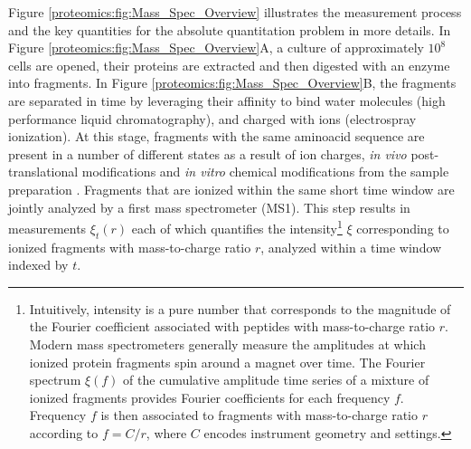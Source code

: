 Figure \ref{proteomics:fig:Mass_Spec_Overview} illustrates the measurement process and the key quantities for the absolute quantitation problem in more details.
In Figure \ref{proteomics:fig:Mass_Spec_Overview}A, a culture of approximately $10^{8}$ cells are opened, their proteins are extracted and then digested with an enzyme into fragments. 
In Figure \ref{proteomics:fig:Mass_Spec_Overview}B, the fragments are separated in time by leveraging their affinity to bind water molecules (high performance liquid chromatography), and charged with ions (electrospray ionization).
At this stage, fragments with the same aminoacid sequence are present in a number of different states as a result of ion charges, \emph{in vivo} post-translational modifications and \emph{in vitro} chemical modifications from the sample preparation \citep{Michalski:2011gm}. 
Fragments that are ionized within the same short time window are jointly analyzed by a first mass spectrometer (MS1).
This step results in measurements $\xi_{t}(r)$ each of which quantifies the intensity\footnote{Intuitively, intensity is a pure number that corresponds to the magnitude of the Fourier coefficient associated with peptides with mass-to-charge ratio $r$. Modern mass spectrometers generally measure the amplitudes at which ionized protein fragments spin around a magnet over time. The Fourier spectrum $\xi(f)$ of the cumulative amplitude time series of a  mixture of ionized fragments provides Fourier coefficients for each frequency $f$. Frequency $f$ is then associated to fragments with  mass-to-charge ratio $r$ according to $f=C/r$, where $C$ encodes instrument geometry and settings.} %
 $\xi$ corresponding to ionized fragments with mass-to-charge ratio $r$, analyzed within a time window indexed by $t$.
%
